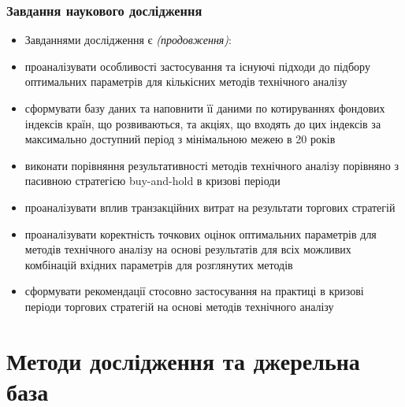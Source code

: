 \documentclass[aspectratio=169]{beamer}
\begin{document}
\begin{frame}
\frametitle{Завдання наукового дослідження}
\begin{itemize}
\item \alert {Завданнями дослідження} є \textit{(продовження)}:
\end{itemize}
\begin{itemize}
    \item[\textcolor{orange}{\textbullet}] проаналізувати особливості застосування та існуючі підходи до підбору оптимальних параметрів для кількісних методів технічного аналізу
    \item[\textcolor{orange}{\textbullet}] сформувати базу даних та наповнити її даними по котируваннях фондових індексів країн, що розвиваються, та акціях, що входять до цих індексів за максимально доступний період з мінімальною межею в 20 років
    \item[\textcolor{orange}{\textbullet}] виконати порівняння результативності методів технічного аналізу порівняно з пасивною стратегією buy-and-hold в кризові періоди
    \item[\textcolor{orange}{\textbullet}] проаналізувати вплив транзакційних витрат на результати торгових стратегій
    \item[\textcolor{orange}{\textbullet}] проаналізувати коректність точкових оцінок оптимальних параметрів для методів технічного аналізу на основі результатів для всіх можливих комбінацій вхідних параметрів для розглянутих методів
    \item[\textcolor{orange}{\textbullet}] сформувати рекомендації стосовно застосування на практиці в кризові періоди торгових стратегій на основі методів технічного аналізу
\end{itemize}
\end{frame}

\section{Методи дослідження та джерельна база}
\end{document}

